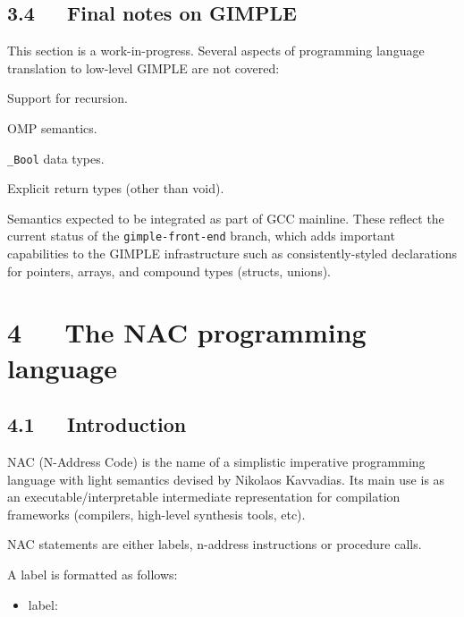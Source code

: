 \documentclass[a4paper]{article}
\begin{document}
\subsection{3.4~~~Final notes on GIMPLE%
  \label{final-notes-on-gimple}%
}

This section is a work-in-progress. Several aspects of programming language
translation to low-level GIMPLE are not covered:
\setcounter{listcnt0}{0}
\begin{list}{.}
{
\setlength{\rightmargin}{\leftmargin}
}

\item Support for recursion.

\item OMP semantics.

\item \texttt{\_Bool} data types.

\item Explicit return types (other than void).

\item Semantics expected to be integrated as part of GCC mainline. These reflect
the current status of the \texttt{gimple-front-end} branch, which adds important
capabilities to the GIMPLE infrastructure such as consistently-styled
declarations for pointers, arrays, and compound types (structs, unions).
\end{list}


\section{4~~~The NAC programming language%
  \label{the-nac-programming-language}%
}


\subsection{4.1~~~Introduction%
  \label{id2}%
}

NAC (N-Address Code) is the name of a simplistic imperative programming language
with light semantics devised by Nikolaos Kavvadias. Its main use is as an
executable/interpretable intermediate representation for compilation frameworks
(compilers, high-level synthesis tools, etc).

NAC statements are either labels, n-address instructions or procedure calls.

A label is formatted as follows:
%
\begin{itemize}

\item label:

\end{itemize}
\end{document}
